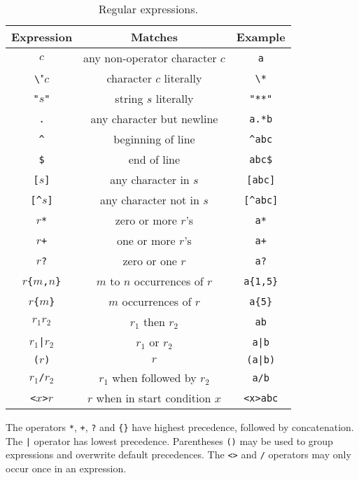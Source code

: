 \documentclass{article}
\begin{document}
\begin{table*}\centering
   \begin{tabular}{c|c|c}
      \hline\hline
      {\sc Expression}& {\sc Matches}& {\sc Example}\\
      \hline
      $c$& any non-operator character $c$& \verb"a"\\
      \verb"\"$c$& character $c$ literally& \verb"\*"\\
      \verb'"'$s$\verb'"'& string $s$ literally& \verb'"**"'\\
      \verb"."& any character but newline& \verb"a.*b"\\
      \verb"^"& beginning of line& \verb"^abc"\\
      \verb"$"& end of line& \verb"abc$"\\
      \verb"["$s$\verb"]"& any character in $s$& \verb"[abc]"\\
      \verb"[^"$s$\verb"]"& any character not in $s$& \verb"[^abc]"\\
      $r$\verb"*"& zero or more $r$'s& \verb"a*"\\
      $r$\verb"+"& one or more $r$'s& \verb"a+"\\
      $r$\verb"?"& zero or one $r$& \verb"a?"\\
      $r$\verb"{"$m$\verb","$n$\verb"}"& $m$ to $n$ occurrences of $r$& \verb"a{1,5}"\\
      $r$\verb"{"$m$\verb"}"& $m$ occurrences of $r$& \verb"a{5}"\\
      $r_1r_2$& $r_1$ then $r_2$& \verb"ab"\\
      $r_1$\verb"|"$r_2$& $r_1$ or $r_2$& \verb"a|b"\\
      \verb"("$r$\verb")"& $r$& \verb"(a|b)"\\
      $r_1$\verb"/"$r_2$& $r_1$ when followed by $r_2$& \verb"a/b"\\
      \verb"<"$x$\verb">"$r$& $r$ when in start condition $x$& \verb"<x>abc"\\
      \hline
   \end{tabular}
   \caption{Regular expressions.}
   \label{tab1}
\end{table*}

The operators \verb"*", \verb"+", \verb"?" and \verb"{}" have highest
precedence, followed by concatenation. The \verb"|" operator has lowest
precedence. Parentheses \verb"()" may be used to group expressions and
overwrite default precedences. The \verb"<>" and \verb"/" operators may only
occur once in an expression.
\end{document}
